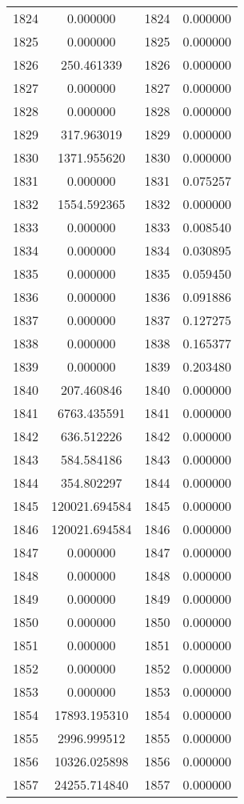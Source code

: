 \documentclass[12pt]{article}
\begin{document}
\begin{longtable}{@{}cccc@{}}
1824 & 0.000000 & 1824 & 0.000000 \\
1825 & 0.000000 & 1825 & 0.000000 \\
1826 & 250.461339 & 1826 & 0.000000 \\
1827 & 0.000000 & 1827 & 0.000000 \\
1828 & 0.000000 & 1828 & 0.000000 \\
1829 & 317.963019 & 1829 & 0.000000 \\
1830 & 1371.955620 & 1830 & 0.000000 \\
1831 & 0.000000 & 1831 & 0.075257 \\
1832 & 1554.592365 & 1832 & 0.000000 \\
1833 & 0.000000 & 1833 & 0.008540 \\
1834 & 0.000000 & 1834 & 0.030895 \\
1835 & 0.000000 & 1835 & 0.059450 \\
1836 & 0.000000 & 1836 & 0.091886 \\
1837 & 0.000000 & 1837 & 0.127275 \\
1838 & 0.000000 & 1838 & 0.165377 \\
1839 & 0.000000 & 1839 & 0.203480 \\
1840 & 207.460846 & 1840 & 0.000000 \\
1841 & 6763.435591 & 1841 & 0.000000 \\
1842 & 636.512226 & 1842 & 0.000000 \\
1843 & 584.584186 & 1843 & 0.000000 \\
1844 & 354.802297 & 1844 & 0.000000 \\
1845 & 120021.694584 & 1845 & 0.000000 \\
1846 & 120021.694584 & 1846 & 0.000000 \\
1847 & 0.000000 & 1847 & 0.000000 \\
1848 & 0.000000 & 1848 & 0.000000 \\
1849 & 0.000000 & 1849 & 0.000000 \\
1850 & 0.000000 & 1850 & 0.000000 \\
1851 & 0.000000 & 1851 & 0.000000 \\
1852 & 0.000000 & 1852 & 0.000000 \\
1853 & 0.000000 & 1853 & 0.000000 \\
1854 & 17893.195310 & 1854 & 0.000000 \\
1855 & 2996.999512 & 1855 & 0.000000 \\
1856 & 10326.025898 & 1856 & 0.000000 \\
1857 & 24255.714840 & 1857 & 0.000000 \\

\end{longtable}
\end{document}
